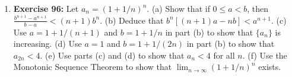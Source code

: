 \documentclass[12pt, a4paper]{article}
\begin{document}
\begin{enumerate}
    \item \textbf{Exercise 96:} Let $a_n = (1 + 1/n)^n$.
    (a) Show that if $0 \le a < b$, then $\frac{b^{n+1}-a^{n+1}}{b-a} < (n+1)b^n$.
    (b) Deduce that $b^n[(n+1)a - nb] < a^{n+1}$.
    (c) Use $a=1+1/(n+1)$ and $b=1+1/n$ in part (b) to show that $\{a_n\}$ is increasing.
    (d) Use $a=1$ and $b=1+1/(2n)$ in part (b) to show that $a_{2n} < 4$.
    (e) Use parts (c) and (d) to show that $a_n < 4$ for all $n$.
    (f) Use the Monotonic Sequence Theorem to show that $\lim_{n \to \infty} (1 + 1/n)^n$ exists.
\end{enumerate}
\end{document}
